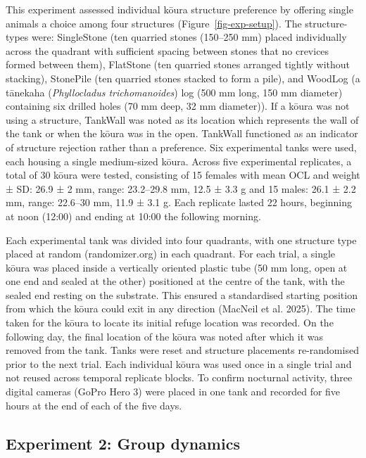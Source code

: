 \documentclass[
  12pt,
  a4paper,
  oneside]{scrbook}
\begin{document}
This experiment assessed individual kōura structure preference by
offering single animals a choice among four structures
(Figure~\ref{fig-exp-setup}). The structure-types were: SingleStone (ten
quarried stones (150--250 mm) placed individually across the quadrant
with sufficient spacing between stones that no crevices formed between
them), FlatStone (ten quarried stones arranged tightly without
stacking), StonePile (ten quarried stones stacked to form a pile), and
WoodLog (a tānekaha (\emph{Phyllocladus trichomanoides}) log (500 mm
long, 150 mm diameter) containing six drilled holes (70 mm deep, 32 mm
diameter)). If a kōura was not using a structure, TankWall was noted as
its location which represents the wall of the tank or when the kōura was
in the open. TankWall functioned as an indicator of structure rejection
rather than a preference. Six experimental tanks were used, each housing
a single medium-sized kōura. Across five experimental replicates, a
total of 30 kōura were tested, consisting of 15 females with mean OCL
and weight ± SD: 26.9 ± 2 mm, range: 23.2--29.8 mm, 12.5 ± 3.3 g and 15
males: 26.1 ± 2.2 mm, range: 22.6--30 mm, 11.9 ± 3.1 g. Each replicate
lasted 22 hours, beginning at noon (12:00) and ending at 10:00 the
following morning.

Each experimental tank was divided into four quadrants, with one
structure type placed at random (randomizer.org) in each quadrant. For
each trial, a single kōura was placed inside a vertically oriented
plastic tube (50 mm long, open at one end and sealed at the other)
positioned at the centre of the tank, with the sealed end resting on the
substrate. This ensured a standardised starting position from which the
kōura could exit in any direction (MacNeil et al. 2025). The time taken
for the kōura to locate its initial refuge location was recorded. On the
following day, the final location of the kōura was noted after which it
was removed from the tank. Tanks were reset and structure placements
re-randomised prior to the next trial. Each individual kōura was used
once in a single trial and not reused across temporal replicate blocks.
To confirm nocturnal activity, three digital cameras (GoPro Hero 3) were
placed in one tank and recorded for five hours at the end of each of the
five days.

\subsection{Experiment 2: Group
dynamics}\label{experiment-2-group-dynamics}
\end{document}
